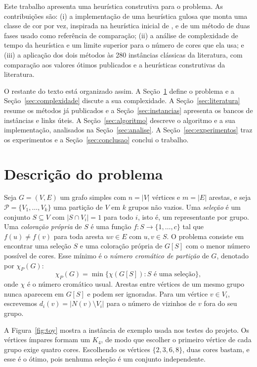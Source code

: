 \documentclass[12pt]{article}
\newcommand{\chiP}{\chi_P}
\begin{document}
Este trabalho apresenta uma heurística construtiva para o problema. As
contribuições são: (i) a implementação de uma heurística gulosa que monta uma
classe de cor por vez, inspirada na heurística inicial de \cite{furini2018}, e
de um método de duas fases usado como referência de comparação; (ii) a análise
de complexidade de tempo da heurística e um limite superior para o número de
cores que ela usa; e (iii) a aplicação dos dois métodos às 280 instâncias
clássicas da literatura, com comparação aos valores ótimos publicados e a
heurísticas construtivas da literatura.

O restante do texto está organizado assim. A Seção~\ref{sec:problema} define o
problema e a Seção~\ref{sec:complexidade} discute a sua complexidade. A
Seção~\ref{sec:literatura} resume os métodos já publicados e a
Seção~\ref{sec:instancias} apresenta os bancos de instâncias e links úteis. A
Seção~\ref{sec:algoritmo} descreve o algoritmo e a sua implementação, analisados
na Seção~\ref{sec:analise}. A Seção~\ref{sec:experimentos} traz os experimentos
e a Seção~\ref{sec:conclusao} conclui o trabalho.

\section{Descrição do problema}\label{sec:problema}

Seja $G=(V,E)$ um grafo simples com $n=|V|$ vértices e $m=|E|$ arestas, e seja
$\mathcal{P}=\{V_1,\dots,V_k\}$ uma partição de $V$ em $k$ grupos não vazios.
Uma \emph{seleção} é um conjunto $S\subseteq V$ com $|S\cap V_i|=1$ para todo
$i$, isto é, um representante por grupo. Uma \emph{coloração própria} de $S$ é
uma função $f:S\to\{1,\dots,c\}$ tal que $f(u)\neq f(v)$ para toda aresta
$uv\in E$ com $u,v\in S$. O problema consiste em encontrar uma seleção $S$ e
uma coloração própria de $G[S]$ com o menor número possível de cores. Esse
mínimo é o \emph{número cromático de partição} de $G$, denotado por $\chiP(G)$:
\[
  \chiP(G)=\min\{\chi(G[S]) : S \text{ é uma seleção}\},
\]
onde $\chi$ é o número cromático usual. Arestas entre vértices de um mesmo grupo
nunca aparecem em $G[S]$ e podem ser ignoradas. Para um vértice $v\in V_i$,
escrevemos $d_i(v)=|N(v)\setminus V_i|$ para o número de vizinhos de $v$ fora
do seu grupo.

A Figura~\ref{fig:toy} mostra a instância de exemplo usada nos testes do
projeto. Os vértices ímpares formam um $K_4$, de modo que escolher o primeiro
vértice de cada grupo exige quatro cores. Escolhendo os vértices
$\{2,3,6,8\}$, duas cores bastam, e esse é o ótimo, pois nenhuma seleção é um
conjunto independente.
\end{document}
